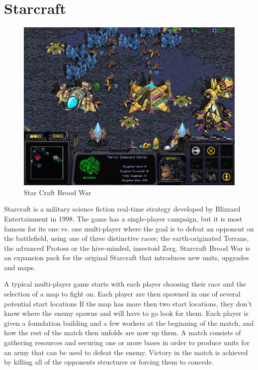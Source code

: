 
\section{Starcraft}

\begin{figure}[h!tb]
\centering
\includegraphics[scale=0.5]{graphics/scbw.jpg}
\caption{Star Craft Brood War}
\label{fig:scbwIntro}
\end{figure}

Starcraft is a military science fiction real-time strategy developed by Blizzard
Entertainment in 1998.\cite{starcraft} The game has a single-player campaign,
but it is most famous for its one vs. one multi-player where the goal is to
defeat an opponent on the battlefield, using one of three distinctive races;
the earth-originated Terrans, the advanced Protoss or the hive-minded,
insectoid Zerg. Starcraft Brood War is an expansion pack for the original
Starcraft that introduces new units, upgrades and maps. 

A typical multi-player game starts with each player choosing their race and the
selection of a map to fight on. Each player are then spawned in one of
several potential start locations If the map has more then two start
locations, they don't know where the enemy spawns and will have to go look for
them. Each player is given a foundation building and a few workers at the
beginning of the match, and how the rest of the match then unfolds are now up
them. A match consists of gathering resources and securing one or more bases in
order to produce units for an army that can be used to defeat the enemy. Victory
in the match is achieved by killing all of the opponents structures or forcing
them to concede.

